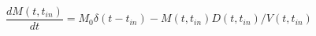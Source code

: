\begin{equation}
\frac{d M(t,t_{in})}{dt} = M_0 \delta(t-t_{in}) - M(t,t_{in})D(t,t_{in})/V(t,t_{in})
\end{equation}